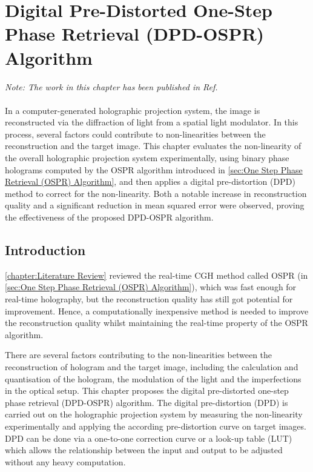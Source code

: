 \chapter{Digital Pre-Distorted One-Step Phase Retrieval (DPD-OSPR) Algorithm} \label{chapter:Digital Pre-Distorted One-Step Phase Retrieval (DPD-OSPR) Algorithm}

\graphicspath{{Chapter_DPD_OSPR/Figs/}}

\textit{Note: The work in this chapter has been published in Ref. \cite{Sha2023DPD}}\\\\

In a computer-generated holographic projection system, the image is reconstructed via the diffraction of light from a spatial light modulator. In this process, several factors could contribute to non-linearities between the reconstruction and the target image. This chapter evaluates the non-linearity of the overall holographic projection system experimentally, using binary phase holograms computed by the OSPR algorithm introduced in \cref{sec:One Step Phase Retrieval (OSPR) Algorithm}, and then applies a digital pre-distortion (DPD) method to correct for the non-linearity. Both a notable increase in reconstruction quality and a significant reduction in mean squared error were observed, proving the effectiveness of the proposed DPD-OSPR algorithm.


\section{Introduction}
\cref{chapter:Literature Review} reviewed the real-time CGH method called OSPR (in \cref{sec:One Step Phase Retrieval (OSPR) Algorithm}), which was fast enough for real-time holography, but the reconstruction quality has still got potential for improvement. Hence, a computationally inexpensive method is needed to improve the reconstruction quality whilst maintaining the real-time property of the OSPR algorithm.

There are several factors contributing to the non-linearities between the reconstruction of hologram and the target image, including the calculation and quantisation of the hologram, the modulation of the light and the imperfections in the optical setup. This chapter proposes the digital pre-distorted one-step phase retrieval (DPD-OSPR) algorithm. The digital pre-distortion (DPD) is carried out on the holographic projection system by measuring the non-linearity experimentally and applying the according pre-distortion curve on target images. DPD can be done via a one-to-one correction curve or a look-up table (LUT) which allows the relationship between the input and output to be adjusted without any heavy computation.

